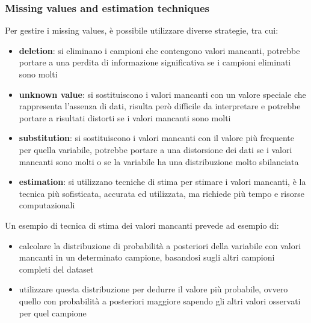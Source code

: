 \subsubsection*{Missing values and estimation techniques}
Per gestire i missing values, è possibile utilizzare diverse strategie, tra cui:
\begin{itemize}
	\item \textbf{deletion}: si eliminano i campioni che contengono valori mancanti, potrebbe portare a una perdita di
	informazione significativa se i campioni eliminati sono molti
	\item \textbf{unknown value}: si sostituiscono i valori mancanti con un valore speciale che rappresenta l'assenza di dati,
	risulta però difficile da interpretare e potrebbe portare a risultati distorti se i valori mancanti sono molti
	\item \textbf{substitution}: si sostituiscono i valori mancanti con il valore più frequente per quella variabile, potrebbe
	portare a una distorsione dei dati se i valori mancanti sono molti o se la variabile ha una distribuzione molto sbilanciata
	\item \textbf{estimation}: si utilizzano tecniche di stima per stimare i valori mancanti, è la tecnica più sofisticata,
	accurata ed utilizzata, ma richiede più tempo e risorse computazionali
\end{itemize}

\noindent
Un esempio di tecnica di stima dei valori mancanti prevede ad esempio di:
\begin{itemize}
	\item calcolare la distribuzione di probabilità a posteriori della variabile con valori mancanti in un determinato campione,
	basandosi sugli altri campioni completi del dataset
	\item utilizzare questa distribuzione per dedurre il valore più probabile, ovvero quello con probabilità a posteriori maggiore
	sapendo gli altri valori osservati per quel campione
\end{itemize}

